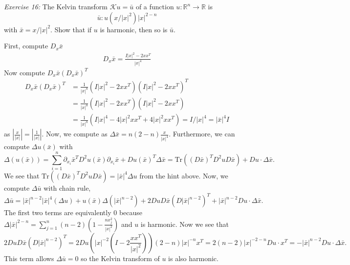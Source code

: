 \documentclass{article}
\newcommand{\exercise}[2]{
\vspace{0.2in}\begin{mdframed}[
  backgroundcolor=problem,
  skipabove=\topsep,
  skipbelow=\topsep
  ]
  \emph{Exercise {#1}:} {#2}
\end{mdframed}}
\newcommand{\R}{\mathbb{R}}
\begin{document}
    \exercise{16}{The Kelvin transform $\mathcal{K} u = \bar{u}$ of a function $u:\R^n\to \R$ is 
    \[\bar{u}: u(x/|x|^2)|x|^{2-n}\]
    with $\bar{x}=x/|x|^2$. Show that if $u$ is harmonic, then so is $\bar{u}$.}
    First, compute $D_x\bar{x}$
    \begin{align*}
      D_x\bar{x} = \frac{I|x|^2 - 2xx^T}{|x|^4}
    \end{align*}
    Now compute $D_x\bar{x}(D_x\bar{x})^T$
    \begin{align*}
      D_x\bar{x}(D_x\bar{x})^T &= \frac{1}{|x|^8}(I|x|^2-2xx^T)(I|x|^2-2xx^T)^T \\
      &=\frac{1}{|x|^8}(I|x|^2-2xx^T)(I|x|^2-2xx^T) \\
      &= \frac{1}{|x|^8}(I|x|^4-4|x|^2xx^T+4|x|^2xx^T) = I/|x|^4 = |\bar{x}|^4I
    \end{align*}
    as $\left|\frac{x}{|x|}\right| = \left|\frac{1}{|x|}\right|$.\newline
    Now, we compute as $\Delta \bar{x} = n(2-n)\frac{x}{|x|^4}$. Furthermore, we can compute $\Delta u(\bar{x})$ with
    \[\Delta (u(\bar{x})) = \sum_{i=1}^n \partial_{x_i} \bar{x}^T D^2u(\bar{x})\partial_{x_i}\bar{x} + Du(\bar{x})^T\Delta \bar{x} = \text{Tr}((D\bar{x})^TD^2uD\bar{x}) + Du\cdot \Delta \bar{x}.\]
    We see that $\text{Tr}((D\bar{x})^TD^2uD\bar{x}) = |\bar{x}|^4\Delta u$ from the hint above. Now, we compute $\Delta \bar{u}$ with chain rule,
    \[\Delta \bar{u} = |\bar{x}|^{n-2}|\bar{x}|^4(\Delta u) + u(\bar{x})\Delta(|\bar{x}|^{n-2}) + 2DuD\bar{x}(D|\bar{x}|^{n-2})^T + |\bar{x}|^{n-2}Du\cdot\Delta \bar{x}.\]
    The first two terms are equivalently $0$ because $\Delta |\bar{x}|^{2-n} = \sum_{j=1}^n (n-2)\left(1 - \frac{nx_j^2}{|x|^2}\right)$ and $u$ is harmonic.\newline
    Now we see that 
    \[2DuD\bar{x}(D|\bar{x}|^{n-2})^T = 2Du\left(|x|^{-2}\left(I - 2 \frac{xx^T}{|x|^2}\right)\right)(2-n)|x|^{-n}x^T = 2(n-2)|x|^{-2-n}Du\cdot x^T = -|\bar{x}|^{n-2}Du\cdot\Delta \bar{x}.\]
    This term allows $\Delta \bar{u} = 0$ so the Kelvin transform of $u$ is also harmonic.

    
\end{document}
